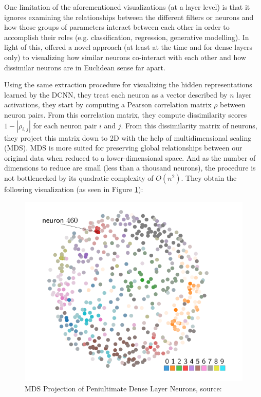 One limitation of the aforementioned visualizations (at a layer level) is that it ignores examining the relationships between the different filters or neurons and how those groups of parameters interact between each other in order to accomplish their roles (e.g. classification, regression, generative modelling). In light of this, \cite{Rauber2017VisualizingTH} offered a novel approach (at least at the time and for dense layers only) to visualizing how similar neurons co-interact with each other and how dissimilar neurons are in Euclidean sense far apart.

Using the same extraction procedure for visualizing the hidden representations learned by the DCNN, they treat each neuron as a vector described by $n$ layer activations, they start by computing a Pearson correlation matrix $\rho$ between neuron pairs. From this correlation matrix, they compute dissimilarity scores $1 - |\rho_{i,j}|$ for each neuron pair $i$ and $j$. From this dissimilarity matrix of neurons, they project this matrix down to 2D with the help of multidimensional scaling (MDS). MDS is more suited for preserving global relationships between our original data when reduced to a lower-dimensional space. And as the number of dimensions to reduce are small (less than a thousand neurons), the procedure is not bottlenecked by its quadratic complexity of $O(n^2)$. They obtain the following visualization (as seen in Figure \ref{fig:HRV_009_Neuron_Spec}):

\vspace{0.2cm}

\begin{figure}[H]
	\centering
	\includegraphics[scale=0.85]{images/embedding_view/HRV_Fig_009_Neuron_Spec.PNG}
	\caption{MDS Projection of Peniultimate Dense Layer Neurons, source: \cite{Rauber2017VisualizingTH}}
	\label{fig:HRV_009_Neuron_Spec}
\end{figure}

